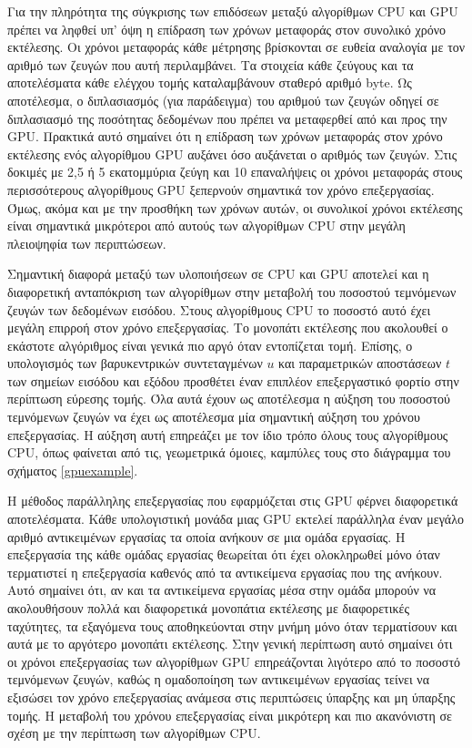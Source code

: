 Για την πληρότητα της σύγκρισης των επιδόσεων μεταξύ αλγορίθμων CPU και GPU πρέπει να ληφθεί υπ' όψη η επίδραση των χρόνων μεταφοράς στον συνολικό χρόνο εκτέλεσης. Οι χρόνοι μεταφοράς κάθε μέτρησης βρίσκονται σε ευθεία αναλογία με τον αριθμό των ζευγών που αυτή περιλαμβάνει. Τα στοιχεία κάθε ζεύγους και τα αποτελέσματα κάθε ελέγχου τομής καταλαμβάνουν σταθερό αριθμό byte. Ως αποτέλεσμα, ο διπλασιασμός (για παράδειγμα) του αριθμού των ζευγών οδηγεί σε διπλασιασμό της ποσότητας δεδομένων που πρέπει να μεταφερθεί από και προς την GPU. Πρακτικά αυτό σημαίνει ότι η επίδραση των χρόνων μεταφοράς στον χρόνο εκτέλεσης ενός αλγορίθμου GPU αυξάνει όσο αυξάνεται ο αριθμός των ζευγών. Στις δοκιμές με 2,5 ή 5 εκατομμύρια ζεύγη και 10 επαναλήψεις οι χρόνοι μεταφοράς στους περισσότερους αλγορίθμους GPU ξεπερνούν σημαντικά τον χρόνο επεξεργασίας. Όμως, ακόμα και με την προσθήκη των χρόνων αυτών, οι συνολικοί χρόνοι εκτέλεσης είναι σημαντικά μικρότεροι από αυτούς των αλγορίθμων CPU στην μεγάλη πλειοψηφία των περιπτώσεων.

Σημαντική διαφορά μεταξύ των υλοποιήσεων σε CPU και GPU αποτελεί και η διαφορετική ανταπόκριση των αλγορίθμων στην μεταβολή του ποσοστού τεμνόμενων ζευγών των δεδομένων εισόδου. Στους αλγορίθμους CPU το ποσοστό αυτό έχει μεγάλη επιρροή στον χρόνο επεξεργασίας. Το μονοπάτι εκτέλεσης που ακολουθεί ο εκάστοτε αλγόριθμος είναι γενικά πιο αργό όταν εντοπίζεται τομή. Επίσης, ο υπολογισμός των βαρυκεντρικών συντεταγμένων $u$ και παραμετρικών αποστάσεων $t$ των σημείων εισόδου και εξόδου προσθέτει έναν επιπλέον επεξεργαστικό φορτίο στην περίπτωση εύρεσης τομής. Όλα αυτά έχουν ως αποτέλεσμα η αύξηση του ποσοστού τεμνόμενων ζευγών να έχει ως αποτέλεσμα μία σημαντική αύξηση του χρόνου επεξεργασίας. Η αύξηση αυτή επηρεάζει με τον ίδιο τρόπο όλους τους αλγορίθμους CPU, όπως φαίνεται από τις, γεωμετρικά όμοιες, καμπύλες τους στο διάγραμμα του σχήματος \ref{gpuexample}. 

Η μέθοδος παράλληλης επεξεργασίας που εφαρμόζεται στις GPU φέρνει διαφορετικά αποτελέσματα. Κάθε υπολογιστική μονάδα μιας GPU εκτελεί παράλληλα έναν μεγάλο αριθμό αντικειμένων εργασίας τα οποία ανήκουν σε μια ομάδα εργασίας. Η επεξεργασία της κάθε ομάδας εργασίας θεωρείται ότι έχει ολοκληρωθεί μόνο όταν τερματιστεί η επεξεργασία καθενός από τα αντικείμενα εργασίας που της ανήκουν. Αυτό σημαίνει ότι, αν και τα αντικείμενα εργασίας μέσα στην ομάδα μπορούν να ακολουθήσουν πολλά και διαφορετικά μονοπάτια εκτέλεσης με διαφορετικές ταχύτητες, τα εξαγόμενα τους αποθηκεύονται στην μνήμη μόνο όταν τερματίσουν και αυτά με το αργότερο μονοπάτι εκτέλεσης. Στην γενική περίπτωση αυτό σημαίνει ότι οι χρόνοι επεξεργασίας των αλγορίθμων GPU επηρεάζονται λιγότερο από το ποσοστό τεμνόμενων ζευγών, καθώς η ομαδοποίηση των αντικειμένων εργασίας τείνει να εξισώσει τον χρόνο επεξεργασίας ανάμεσα στις περιπτώσεις ύπαρξης και μη ύπαρξης τομής. Η μεταβολή του χρόνου επεξεργασίας είναι μικρότερη και πιο ακανόνιστη σε σχέση με την 
περίπτωση των αλγορίθμων CPU.

